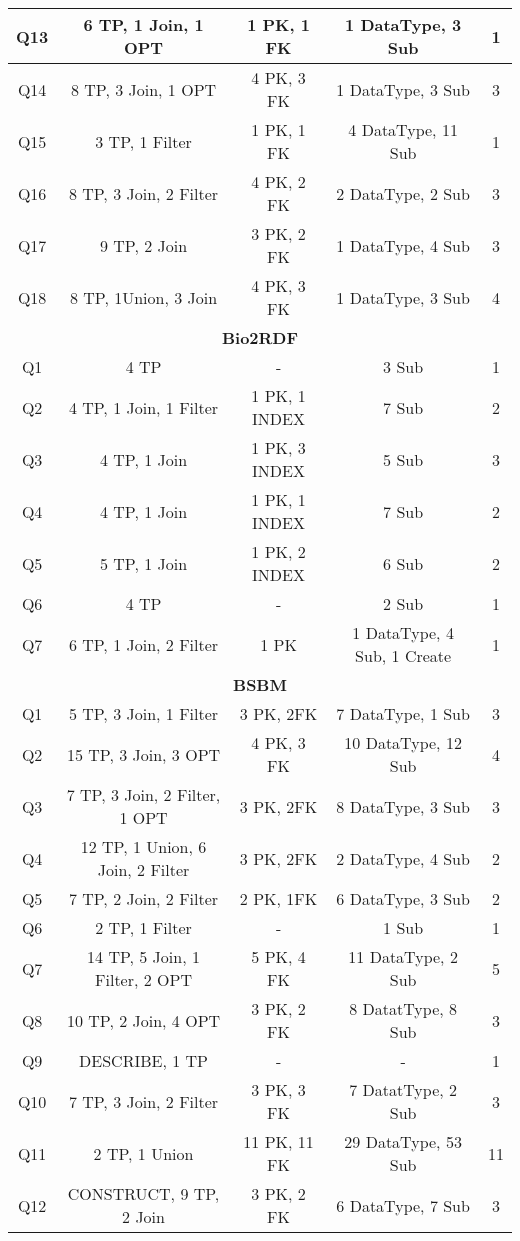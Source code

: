 \begin{table}[h]
{\begin{tabular}{c|c|c|c|c}
Q13 & 6 TP, 1 Join, 1 OPT & 1 PK, 1 FK & 1 DataType, 3 Sub & 1 \\ \hline
Q14 & 8 TP, 3 Join, 1 OPT & 4 PK, 3 FK & 1 DataType, 3 Sub & 3 \\ \hline
Q15 & 3 TP, 1 Filter & 1 PK, 1 FK & 4 DataType, 11 Sub & 1 \\ \hline
Q16 & 8 TP, 3 Join, 2 Filter & 4 PK, 2 FK & 2 DataType, 2 Sub & 3 \\ \hline
Q17 & 9 TP, 2 Join & 3 PK, 2 FK & 1 DataType, 4 Sub & 3 \\ \hline
Q18 & 8 TP, 1Union, 3 Join & 4 PK, 3 FK & 1 DataType, 3 Sub & 4 \\ \hline
\multicolumn{5}{c}{\textbf{Bio2RDF}} \\ \hline
Q1 & 4 TP & - & 3 Sub & 1 \\ \hline
Q2 & 4 TP, 1 Join, 1 Filter & 1 PK, 1 INDEX & 7 Sub & 2 \\ \hline
Q3 & 4 TP, 1 Join & 1 PK, 3 INDEX & 5 Sub & 3 \\ \hline
Q4 & 4 TP, 1 Join & 1 PK, 1 INDEX & 7 Sub & 2 \\ \hline
Q5 & 5 TP, 1 Join & 1 PK, 2 INDEX & 6 Sub & 2 \\ \hline
Q6 & 4 TP & - & 2 Sub & 1 \\ \hline
Q7 & 6 TP, 1 Join, 2 Filter & 1 PK & 1 DataType, 4 Sub, 1 Create & 1 \\ \hline
\multicolumn{5}{c}{\textbf{BSBM}} \\ \hline
Q1 & 5 TP, 3 Join, 1 Filter & 3 PK, 2FK & 7 DataType, 1 Sub & 3 \\ \hline
Q2 & 15 TP, 3 Join, 3 OPT & 4 PK, 3 FK & 10 DataType, 12 Sub & 4 \\ \hline
Q3 & 7 TP, 3 Join, 2 Filter, 1 OPT & 3 PK, 2FK & 8 DataType, 3 Sub & 3 \\ \hline
Q4 & 12 TP, 1 Union, 6 Join, 2 Filter & 3 PK, 2FK & 2 DataType, 4 Sub & 2 \\ \hline
Q5 & 7 TP, 2 Join, 2 Filter & 2 PK, 1FK & 6 DataType, 3 Sub & 2 \\ \hline
Q6 & 2 TP, 1 Filter & - & 1 Sub & 1 \\ \hline
Q7 & 14 TP, 5 Join, 1 Filter, 2 OPT & 5 PK, 4 FK & 11 DataType, 2 Sub & 5 \\ \hline
Q8 & 10 TP, 2 Join, 4 OPT & 3 PK, 2 FK & 8 DatatType, 8 Sub & 3 \\ \hline
Q9 & DESCRIBE, 1 TP & - & - & 1 \\ \hline
Q10 & 7 TP, 3 Join, 2 Filter & 3 PK, 3 FK & 7 DatatType, 2 Sub & 3 \\ \hline
Q11 & 2 TP, 1 Union & 11 PK, 11 FK & 29 DataType, 53 Sub & 11 \\ \hline
Q12 & CONSTRUCT, 9 TP, 2 Join & 3 PK, 2 FK & 6 DataType, 7 Sub & 3 \\ \hline
\end{tabular}%
}
\end{table}